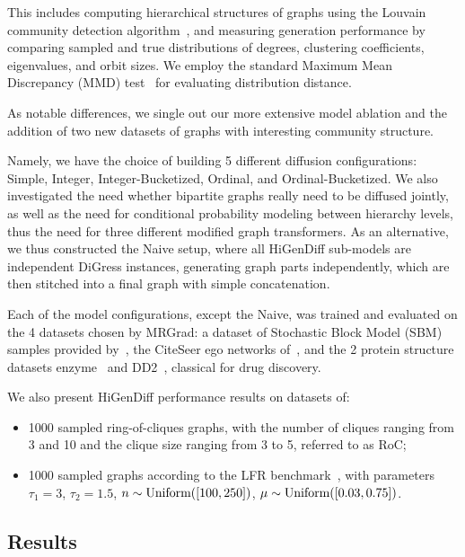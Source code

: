 This includes computing hierarchical structures of graphs using the Louvain community detection algorithm~\cite{blondel_fast_2008}, and measuring generation performance by comparing sampled and true distributions of degrees, clustering coefficients, eigenvalues, and orbit sizes. We employ the standard Maximum Mean Discrepancy (MMD) test~\cite{gretton_kernel_2012} for evaluating distribution distance. 

As notable differences, we single out our more extensive model ablation and the addition of two new datasets of graphs with interesting community structure.

Namely, we have the choice of building 5 different diffusion configurations: Simple, Integer, Integer-Bucketized, Ordinal, and Ordinal-Bucketized. We also investigated the need whether bipartite graphs really need to be diffused jointly, as well as the need for conditional probability modeling between hierarchy levels, thus the need for three different modified graph transformers. As an alternative, we thus constructed the Naive setup, where all HiGenDiff sub-models are independent DiGress instances, generating graph parts independently, which are then stitched into a final graph with simple concatenation.

Each of the model configurations, except the Naive, was trained and evaluated on the 4 datasets chosen by MRGrad: a dataset of Stochastic Block Model (SBM) samples provided by~\cite{martinkus_spectre_2022}, the CiteSeer ego networks of~\cite{sen_collective_2008}, and the 2 protein structure datasets enzyme~\cite{schomburg_brenda_2004} and DD2~\cite{dobson_distinguishing_2003}, classical for drug discovery. 

We also present HiGenDiff performance results on datasets of:
\begin{itemize}
    \item 1000 sampled ring-of-cliques graphs, with the number of cliques ranging from 3 and 10 and the clique size ranging from 3 to 5, referred to as RoC;
    \item 1000 sampled graphs according to the LFR benchmark~\cite{lancichinetti_finding_2011}, with parameters $\tau_1=3$, $\tau_2=1.5$, $n \sim \text{Uniform}\mathopen{}\left(\mathopen{}\left[100, 250\right]\right)$, $\mu \sim \text{Uniform}\mathopen{}\left(\mathopen{}\left[0.03, 0.75\right]\right)$.
\end{itemize}

\subsection{Results}

